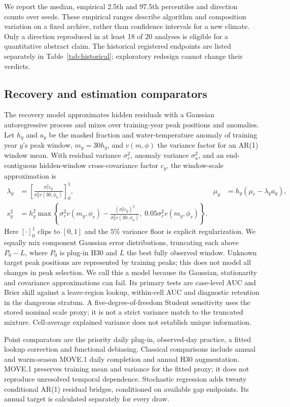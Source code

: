 \documentclass[draft,linenumbers]{agujournal2025}
\begin{document}
We report the median, empirical 2.5th and 97.5th percentiles and direction counts over seeds. These empirical ranges describe algorithm and composition variation on a fixed archive, rather than confidence intervals for a new climate. Only a direction reproduced in at least 18 of 20 analyses is eligible for a quantitative abstract claim. The historical registered endpoints are listed separately in Table~\ref{tab:historical}; exploratory redesign cannot change their verdicts.

\subsection{Recovery and estimation comparators}
The recovery model approximates hidden residuals with a Gaussian autoregressive process and mixes over training-year peak positions and anomalies. Let $h_y$ and $a_y$ be the masked fraction and water-temperature anomaly of training year $y$'s peak window, $m_y=30h_y$, and $v(m,\phi)$ the variance factor for an AR(1) window mean. With residual variance $\sigma_r^2$, anomaly variance $\sigma_a^2$, and an end-contiguous hidden-window cross-covariance factor $c_y$, the window-scale approximation is
\begin{align}
\lambda_y&=\left[\frac{\sigma_r^2c_y}{\sigma_a^2v(30,\phi_a)}\right]_0^1, &
\mu_y&=h_y(\mu_r-\lambda_y a_y),\\
s_y^2&=h_y^2\max\left\{\sigma_r^2v(m_y,\phi_r)-\frac{(\sigma_r^2c_y)^2}{\sigma_a^2v(30,\phi_a)},\;0.05\sigma_r^2v(m_y,\phi_r)\right\}.
\end{align}
Here $[\cdot]_0^1$ clips to $[0,1]$ and the 5\% variance floor is explicit regularization. We equally mix component Gaussian error distributions, truncating each above $P_0-L$, where $P_0$ is plug-in H30 and $L$ the best fully observed window. Unknown target peak positions are represented by training peaks; this does not model all changes in peak selection. We call this a model because its Gaussian, stationarity and covariance approximations can fail. Its primary tests are case-level AUC and Brier skill against a leave-region lookup, within-cell AUC and diagnostic retention in the dangerous stratum. A five-degree-of-freedom Student sensitivity uses the stored nominal scale proxy; it is not a strict variance match to the truncated mixture. Cell-average explained variance does not establish unique information.

Point comparators are the priority daily plug-in, observed-day practice, a fitted lookup correction and functional debiasing. Classical comparisons include annual and warm-season MOVE.1 daily completion and annual H30 augmentation. MOVE.1 preserves training mean and variance for the fitted proxy; it does not reproduce unresolved temporal dependence. Stochastic regression adds twenty conditional AR(1) residual bridges, conditioned on available gap endpoints. Its annual target is calculated separately for every draw.
\end{document}
